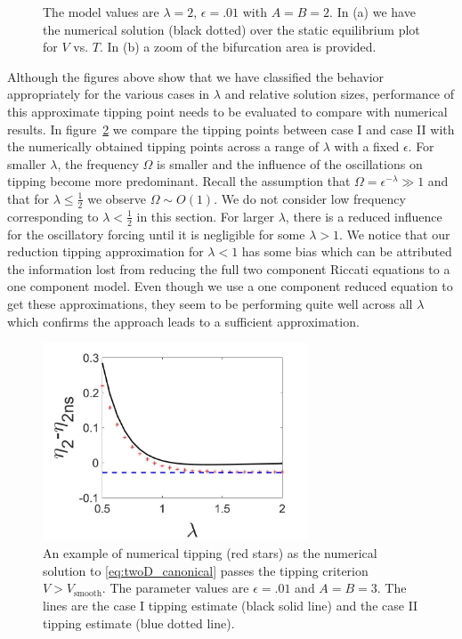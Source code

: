 \begin{figure}[H]
\begin{subfigure}{.5\textwidth}
 \caption{}
\end{subfigure}
\caption{The model values are $\lambda=2$, $\epsilon=.01$ with $A=B=2$. In (a) we have the numerical solution (black dotted) over the static equilibrium plot for $V$ vs. $T$. In (b) a zoom of the bifurcation area is provided.}
\label{fig:twoD_slowosc_Tnumerics_large}
\end{figure}

\indent Although the figures above show that we have classified the behavior appropriately for the various cases in $\lambda$ and relative solution sizes, performance of this approximate tipping point needs to be evaluated to compare with numerical results. In figure~\ref{fig:twoD_slowosc_lambdacomp} we compare the tipping points between case I and case II with the numerically obtained tipping points across a range of $\lambda$ with a fixed $\epsilon$. For smaller $\lambda$, the frequency $\Omega$ is smaller and the influence of the oscillations on tipping become more predominant. Recall the assumption that $\Omega=\epsilon^{-\lambda}\gg 1$ and that for $\lambda\le\frac{1}{2}$ we observe $\Omega\sim O(1)$. We do not consider low frequency corresponding to $\lambda<\frac{1}{2}$ in this section. For larger $\lambda$, there is a reduced influence for the oscillatory forcing until it is negligible for some $\lambda>1$. We notice that our reduction tipping approximation for $\lambda<1$ has some bias which can be attributed the information lost from reducing the full two component Riccati equations to a one component model. Even though we use a one component reduced equation to get these approximations, they seem to be performing quite well across all $\lambda$ which confirms the approach leads to a sufficient approximation.

\begin{figure}[H]
\centering
\includegraphics[width=0.7\textwidth]{twoD/slowosc_lambdacomp.jpg}
\caption{An example of numerical tipping (red stars) as the numerical solution to \eqref{eq:twoD_canonical} passes the tipping criterion $V>V_{\text{smooth}}$. The parameter values are $\epsilon=.01$ and $A=B=3$. The lines are the case I tipping estimate (black solid line) and the case II tipping estimate (blue dotted line).}
\label{fig:twoD_slowosc_lambdacomp}
\end{figure} 

